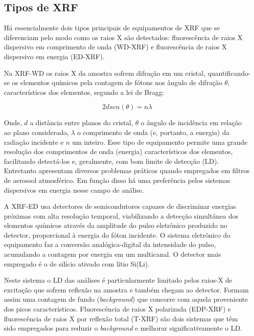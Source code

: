\subsection{Tipos de XRF}

Há essencialmente dois tipos principais de equipamentos de XRF que se 
diferenciam pelo modo como os raios X são detectados: fluorescência de raios 
X dispersivo em comprimento de onda (WD-XRF) e fluorescência de raios X 
dispersivo em energia (ED-XRF).

Na XRF-WD os raios X da amostra sofrem difração em um cristal, quantificando-se
os elementos químicos pela contagem de fótons nos ângulo de difração $\theta$, 
característicos dos elementos, segundo a lei de Bragg:

\begin{equation}
	\label{eq:bragg}
	2d sen(\theta) = n \lambda
\end{equation}

Onde, $d$ a distância entre planos do cristal, $\theta$ o ângulo de incidência 
em relação ao plano considerado, $\lambda$ o comprimento de onda 
(e, portanto, a energia) da radiação incidente e $n$ um inteiro.
Esse tipo de equipamento permite uma grande resolução dos comprimentos de onda 
(energia) característicos dos elementos, facilitando detectá-los e, geralmente, 
com bom limite de detecção (LD).
Entretanto apresentam diversos problemas práticos quando empregados em filtros 
de aerossol atmosférico. Em função disso há uma preferência pelos sistemas 
dispersivos em energia nesse campo de análise. 

A XRF-ED usa detectores de semicondutores capazes de discriminar energias 
próximas com alta resolução temporal, viabilizando a detecção simultânea dos 
elementos químicos através da amplitude do pulso eletrônico produzido no 
detector, proporcional à energia do fóton incidente. O sistema eletrônico do 
equipamento faz a conversão analógica-digital da intensidade do pulso, 
acumulando a contagem por energia em um multicanal. O detector mais empregado é 
o de silício ativado com lítio Si(Li). 

Neste sistema o LD das análises é particularmente limitado pelos raios-X de 
excitação que sofrem reflexão na amostra e também chegam ao detector. 
Formam assim uma contagem de fundo (\textit{background}) que concorre com 
aquela proveniente dos picos característicos. 
Fluorescência de raios X polarizada (EDP-XRF) e fluorescência de raios X por 
reflexão total (T-XRF) são dois sistemas que têm sido empregados 
para reduzir o \textit{background} e melhorar significativamente o LD.

